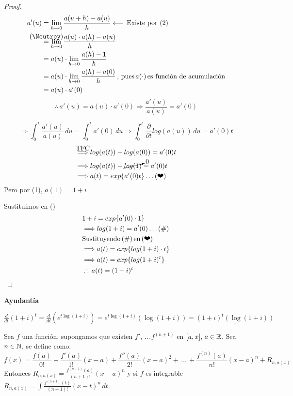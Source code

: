 \begin{proof}
\begin{align*}
a'(u) &= \lim\limits_{h \to 0} \frac{a(u+h)-a(u)}{h} \longleftarrow \, \text{Existe por (2)} \\
&\stackrel{\mathclap{\normalfont\mbox{(\Neutrey)}}}{=} \lim\limits_{h \to 0} \frac{a(u)\cdot a(h) - a(u)}{h}\\
&=  a(u) \cdot \lim\limits_{h \to 0} \frac{a(h)-1}{h}\\
&=  a(u) \cdot \lim\limits_{h \to 0} \frac{a(h)-a(0)}{h}\, \text{, pues} \, a(\cdot) \, \text{es función de acumulación}\\
&= a(u)\cdot a'(0)
\end{align*}
\[\therefore \, a'(u) = a(u) \cdot a'(0) \Longrightarrow \frac{a'(u)}{a(u)} = a'(0)\]

$$\Longrightarrow \int_{0}^{t}\frac{a'(u)}{a(u)}\, du = \int_{0}^{t} a'(0)\, du \Longrightarrow \int_{0}^{t} \frac{\partial}{\partial t} log(a(u)) \, du = a'(0)t$$
\begin{align*}
&\stackrel{\mathclap{\normalfont\mbox{\text{TFC}}}}{\Longrightarrow} log(a(t)) - log(a(0)) = a'(0)t\\
&\Longrightarrow log(a(t)) - \cancelto{0}{ log(1)} = a'(0)t\\
&\Longrightarrow a(t) = exp\{a'(0)t\} \ldots (\text{\ding{164}})
\end{align*}
Pero por (1), $a(1) = 1+i$

Sustituimos en () 
\begin{align*}
&1+i = exp\{a'(0)\cdot 1\} \\
&\Longrightarrow log(1+i) = a'(0) \ldots (\#)\\
&\text{Sustituyendo}\,(\#)\, \text{en} \, (\text{\ding{164}})\\
& \Longrightarrow a(t) = exp\{log(1+i)\cdot t\}\\
& \Longrightarrow a(t) = exp\{log(1+i)^t\}\\
& \therefore \, a(t) = (1+i)^t
\end{align*}
\end{proof}
\newpage
\textbf{Ayudantía}

$\frac{d}{dt}(1+i)^t = \frac{d}{dt} \left(e^{t\log(1+i)} \right)= e^{t\log(1+i)}\left(\log(1+i)\right) =\underline{(1+i)^t\left( \log(1+i)\right)}$

\begin{theorem}
Sea $f$ una función, supongamos que existen $f', \, \ldots \, f^{(n+1)}$ en $[a,x], \, a\in\mathbb R$. Sea $n\in\mathbb N$, se define como:
$$f(x) = \frac{f(a)}{0!}+\frac{f'(a)}{1!}(x-a)+\frac{f''(a)}{2!}(x-a)^2 + \, \ldots \, + \frac{f^{(n)}(a)}{n!}(x-a)^n + R_{n, a(x)}$$
Entonces $R_{n, a(x)} = \frac{f^{(n+1)}(a)}{(n+1)!}(x-a)^n$ y si $f$ es integrable
$R_{n, a(x)} = \int\frac{f^{(n+1)}(t)}{(n+1)!}(x-t)^n\, dt$.
\end{theorem} 

